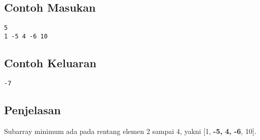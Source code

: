 \documentclass{article}
\begin{document}
\begin{multicols}{2}
\subsection*{Contoh Masukan}
\begin{lstlisting}
5
1 -5 4 -6 10

\end{lstlisting}
\columnbreak
\subsection*{Contoh Keluaran}
\begin{lstlisting}
-7
\end{lstlisting}
\vfill
\null
\end{multicols}

\subsection*{Penjelasan}

Subarray minimum ada pada rentang elemen 2 sampai 4, yakni [1, \textbf{-5, 4, -6}, 10].
\end{document}
